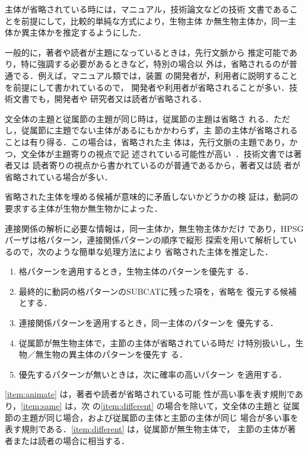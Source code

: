 主体が省略されている時には，マニュアル，技術論文などの技術
文書であることを前提にして，比較的単純な方式により，生物主体
か無生物主体か，同一主体か異主体かを推定するようにした．

一般的に，著者や読者が主題になっているときは，先行文脈から
推定可能であり，特に強調する必要があるときなど，特別の場合以
外は，省略されるのが普通でる．例えば，マニュアル類では，装置
の開発者が，利用者に説明することを前提にして書かれているので，
開発者や利用者が省略されることが多い．技術文書でも，開発者や
研究者又は読者が省略される．

文全体の主題と従属節の主題が同じ時は，従属節の主題は省略さ
れる．ただし，従属節に主題でない主体があるにもかかわらず，主
節の主体が省略されることは有り得る．この場合は，省略された主
体は，先行文脈の主題であり，かつ，文全体が主題寄りの視点で記
述されている可能性が高い~\cite{Kuno1978}．技術文書では著者又は
読者寄りの視点から書かれているのが普通であるから，著者又は読
者が省略されている場合が多い．

省略された主体を埋める候補が意味的に矛盾しないかどうかの検
証は，動詞の要求する主体が生物か無生物かによった．

連接関係の解析に必要な情報は，同一主体か，無生物主体かだけ
であり，HPSGパーザは格パターン，連接関係パターンの順序で縦形
探索を用いて解析しているので，次のような簡単な処理方法により
省略された主体を推定した．
\begin{enumerate}
\item 
格パターンを適用するとき，生物主体のパターンを優先す
る．\label{item:animate}
\item 
最終的に動詞の格パターンのSUBCATに残った項を，省略を
復元する候補とする．\label{item:subcat}
\item 
連接関係パターンを適用するとき，同一主体のパターンを
優先する．\label{item:same}
\item 
従属節が無生物主体で，主節の主体が省略されている時だ
け特別扱いし，生物／無生物の異主体のパターンを優先す
る．\label{item:different}
\item 
優先するパターンが無いときは，次に確率の高いパターン
を適用する．
\end{enumerate}

\ref{item:animate} は，著者や読者が省略されている可能
性が高い事を表す規則であり，\ref{item:same} は，次
の\ref{item:different} の場合を除いて，文全体の主題と
従属節の主題が同じ場合，および従属節の主体と主節の主体が同じ
場合が多い事を表す規則である．\ref{item:different} は，従属節が無生物主体で，
主節の主体が著者または読者の場合に相当する．

